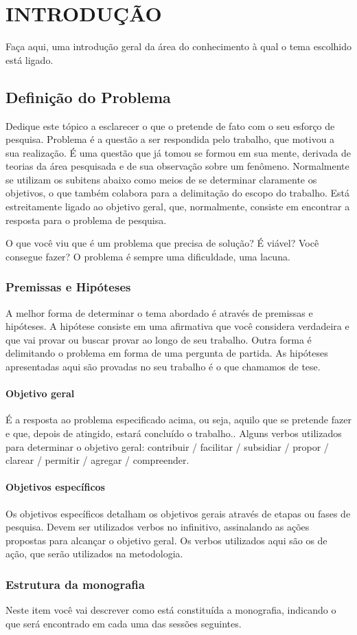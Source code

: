 \chapter{INTRODUÇÃO}

Faça aqui, uma introdução geral da área do conhecimento à qual o tema escolhido está ligado. 

\section{Definição do Problema}

Dedique este tópico a esclarecer o que o pretende de fato com o seu esforço de pesquisa. Problema é a questão a ser respondida pelo trabalho, que motivou a sua realização. É uma questão que já tomou se formou em sua mente, derivada de teorias da área pesquisada e de sua observação sobre um fenômeno. Normalmente se utilizam os subitens abaixo como meios de se determinar claramente os objetivos, o que também colabora para a delimitação do escopo do trabalho. Está estreitamente ligado ao objetivo geral, que, normalmente, consiste em encontrar a resposta para o problema de pesquisa.

O que você viu que é um problema que precisa de solução? É viável? Você consegue fazer? O problema é sempre uma dificuldade, uma lacuna.

\subsection{Premissas e Hipóteses}
A melhor forma de determinar o tema abordado é através de premissas e hipóteses. A hipótese consiste em uma afirmativa que você considera verdadeira e que vai provar ou buscar provar ao longo de seu trabalho. Outra forma é delimitando o problema em forma de uma pergunta de partida. As hipóteses apresentadas aqui são provadas no seu trabalho é o que chamamos de tese. 

\subsubsection{Objetivo geral}
É a resposta ao problema especificado acima, ou seja, aquilo que se pretende fazer e que, depois de atingido, estará concluído o trabalho.. Alguns verbos utilizados para determinar o objetivo geral: contribuir / facilitar / subsidiar / propor / clarear / permitir / agregar / compreender.

\subsubsection{Objetivos específicos}
Os objetivos específicos detalham os objetivos gerais através de etapas ou fases de pesquisa. Devem ser utilizados verbos no infinitivo, assinalando as ações propostas para alcançar o objetivo geral. Os verbos utilizados aqui são os de ação, que serão utilizados na metodologia.

\subsection{Estrutura da monografia}
Neste item você vai descrever como está constituída a monografia, indicando o que será encontrado em cada uma das sessões seguintes.

